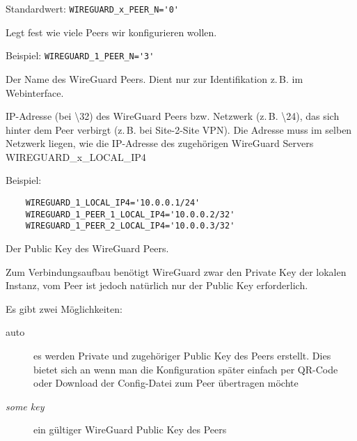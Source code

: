 \begin{description}


Standardwert: \verb+WIREGUARD_x_PEER_N='0'+

Legt fest wie viele Peers wir konfigurieren wollen.

Beispiel: \verb+WIREGUARD_1_PEER_N='3'+



Der Name des WireGuard Peers. Dient nur zur Identifikation z.\,B. im Webinterface.



IP-Adresse (bei \textbackslash32) des WireGuard Peers bzw. Netzwerk (z.\,B. \textbackslash24), das
sich hinter dem Peer verbirgt (z.\,B. bei Site-2-Site VPN). Die Adresse muss im selben Netzwerk liegen,
wie die IP-Adresse des zugehörigen WireGuard Servers WIREGUARD\_x\_LOCAL\_IP4

Beispiel:

\begin{example}
\begin{verbatim}
    WIREGUARD_1_LOCAL_IP4='10.0.0.1/24'
    WIREGUARD_1_PEER_1_LOCAL_IP4='10.0.0.2/32'
    WIREGUARD_1_PEER_2_LOCAL_IP4='10.0.0.3/32'
\end{verbatim}
\end{example}



Der Public Key des WireGuard Peers.

Zum Verbindungsaufbau benötigt WireGuard zwar den Private Key der lokalen Instanz, vom Peer ist jedoch
natürlich nur der Public Key erforderlich.

Es gibt zwei Möglichkeiten:

\begin{description}
    \item[auto] es werden Private und zugehöriger Public Key des Peers erstellt. Dies bietet sich an
    wenn man die Konfiguration später einfach per QR-Code oder Download der Config-Datei zum Peer
    übertragen möchte
    \item[\textit{some key}] ein gültiger WireGuard Public Key des Peers
\end{description}

\end{description}


